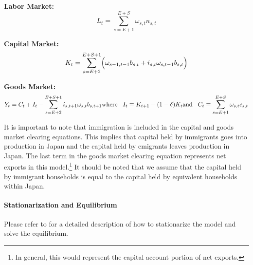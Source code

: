 \documentclass[10pt]{article}
\renewcommand{\thesection}{\arabic{section}}
\renewcommand{\thesubsection}{\thesection.\arabic{subsection}}
\renewcommand{\thesubsubsection}{\thesubsection.\arabic{subsubsection}}
\renewcommand{\subsubsection}[2][]{\oldsubsubsection[#1]{#2}\index{#1}\label{sec:\thesubsubsection}}
\numberwithin{equation}{subsection}
\begin{document}
\begin{appendices}
\textbf{Labor Market:}
\begin{equation}
   L_t = \sum_{s=E+1}^{E+S}\omega_{s,t}n_{s,t}
\end{equation}

\textbf{Capital Market:}
\begin{equation}
   K_t = \sum_{s=E+2}^{E+S+1}\Bigl(\omega_{s-1,t-1}b_{s,t}+i_{s,t}\omega_{s,t-1}b_{s,t}\Bigr)
\end{equation}

\textbf{Goods Market:}
\begin{dmath}
   Y_t = C_t + I_t - \sum_{s=E+2}^{E+S+1}i_{s,t+1}\omega_{s,t}b_{s,t+1} \\
   {\text{where} \hspace{3mm} I_t \equiv K_{t+1} - (1-\delta)K_t} \\
   {\text{and} \hspace{3mm} C_t \equiv \sum_{s=E+1}^{E+S}\omega_{s,t}c_{s,t}}
\end{dmath}

\par It is important to note that immigration is included in the capital and goods market clearing equations. This implies that capital held by immigrants goes into production in Japan and the capital held by emigrants leaves production in Japan. The last term in the goods market clearing equation represents net exports in this model.\footnote{In general, this would represent the capital account portion of net exports.} It should be noted that we assume that the capital held by immigrant households is equal to the capital held by equivalent households within Japan.


\paragraph{Stationarization and Equilibrium}

\par Please refer to \cite{E2020} for a detailed description of how to stationarize the model and solve the equilibrium.



\end{appendices}
\end{document}
